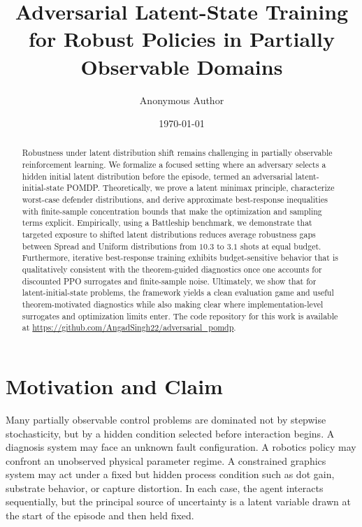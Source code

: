 \documentclass[11pt]{article}
\title{Adversarial Latent-State Training for Robust Policies in Partially Observable Domains}
\author{
  Anonymous Author
}
\date{\today}
\begin{document}
\maketitle

\begin{abstract}
Robustness under latent distribution shift remains challenging in partially observable reinforcement learning. We formalize a focused setting where an adversary selects a hidden initial latent distribution before the episode, termed an adversarial latent-initial-state POMDP. Theoretically, we prove a latent minimax principle, characterize worst-case defender distributions, and derive approximate best-response inequalities with finite-sample concentration bounds that make the optimization and sampling terms explicit. Empirically, using a Battleship benchmark, we demonstrate that targeted exposure to shifted latent distributions reduces average robustness gaps between Spread and Uniform distributions from $10.3$ to $3.1$ shots at equal budget. Furthermore, iterative best-response training exhibits budget-sensitive behavior that is qualitatively consistent with the theorem-guided diagnostics once one accounts for discounted PPO surrogates and finite-sample noise. Ultimately, we show that for latent-initial-state problems, the framework yields a clean evaluation game and useful theorem-motivated diagnostics while also making clear where implementation-level surrogates and optimization limits enter. The code repository for this work is available at \url{https://github.com/AngadSingh22/adversarial_pomdp}.
\end{abstract}

\section{Motivation and Claim}

Many partially observable control problems are dominated not by stepwise stochasticity, but by a hidden condition selected before interaction begins. A diagnosis system may face an unknown fault configuration. A robotics policy may confront an unobserved physical parameter regime. A constrained graphics system may act under a fixed but hidden process condition such as dot gain, substrate behavior, or capture distortion. In each case, the agent interacts sequentially, but the principal source of uncertainty is a latent variable drawn at the start of the episode and then held fixed.
\end{document}
